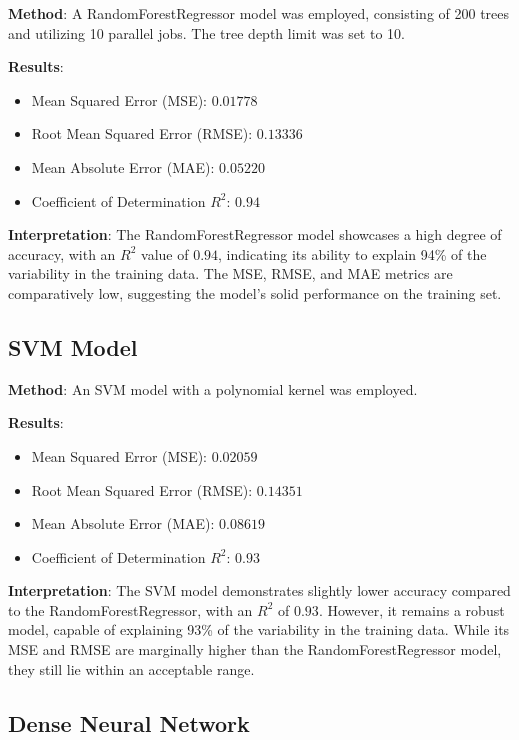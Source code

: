 \documentclass[conference]{IEEEtran}
\begin{document}
\textbf{Method}: A RandomForestRegressor model was employed, consisting of 200 trees and utilizing 10 parallel jobs. The tree depth limit was set to 10.

\textbf{Results}:
\begin{itemize}
    \item Mean Squared Error (MSE): $0.01778$
    \item Root Mean Squared Error (RMSE): $0.13336$
    \item Mean Absolute Error (MAE): $0.05220$
    \item Coefficient of Determination $R^2$: $0.94$
\end{itemize}

\textbf{Interpretation}: The RandomForestRegressor model showcases a high degree of accuracy, with an $R^2$ value of $0.94$, indicating its ability to explain 94\% of the variability in the training data. The MSE, RMSE, and MAE metrics are comparatively low, suggesting the model's solid performance on the training set.

\subsection{SVM Model}

\textbf{Method}: An SVM model with a polynomial kernel was employed.

\textbf{Results}:
\begin{itemize}
    \item Mean Squared Error (MSE): $0.02059$
    \item Root Mean Squared Error (RMSE): $0.14351$
    \item Mean Absolute Error (MAE): $0.08619$
    \item Coefficient of Determination $R^2$: $0.93$
\end{itemize}

\textbf{Interpretation}: The SVM model demonstrates slightly lower accuracy compared to the RandomForestRegressor, with an $R^2$ of $0.93$. However, it remains a robust model, capable of explaining 93\% of the variability in the training data. While its MSE and RMSE are marginally higher than the RandomForestRegressor model, they still lie within an acceptable range.

\subsection{Dense Neural Network}
\end{document}
